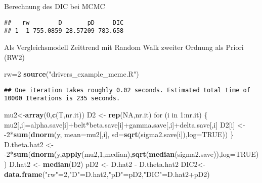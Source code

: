 \documentclass[ignorenonframetext,]{beamer}
\newenvironment{Shaded}{\begin{snugshade}}{\end{snugshade}}
\newcommand{\KeywordTok}[1]{\textcolor[rgb]{0.13,0.29,0.53}{\textbf{{#1}}}}
\newcommand{\DataTypeTok}[1]{\textcolor[rgb]{0.13,0.29,0.53}{{#1}}}
\newcommand{\DecValTok}[1]{\textcolor[rgb]{0.00,0.00,0.81}{{#1}}}
\newcommand{\StringTok}[1]{\textcolor[rgb]{0.31,0.60,0.02}{{#1}}}
\newcommand{\OtherTok}[1]{\textcolor[rgb]{0.56,0.35,0.01}{{#1}}}
\newcommand{\NormalTok}[1]{{#1}}
\begin{document}
\begin{frame}{Berechnung des DIC bei MCMC}
\begin{verbatim}
##   rw        D       pD     DIC
## 1  1 755.0859 28.57209 783.658
\end{verbatim}

Als Vergleichsmodell Zeittrend mit Random Walk zweiter Ordnung als
Priori (RW2)

\begin{Shaded}
\begin{Highlighting}[]
\NormalTok{rw=}\DecValTok{2}
\KeywordTok{source}\NormalTok{(}\StringTok{"drivers_example_mcmc.R"}\NormalTok{)}
\end{Highlighting}
\end{Shaded}

\begin{verbatim}
## One iteration takes roughly 0.02 seconds. Estimated total time of 10000 Iterations is 235 seconds.
\end{verbatim}

\begin{Shaded}
\begin{Highlighting}[]
\NormalTok{mu2<-}\KeywordTok{array}\NormalTok{(}\DecValTok{0}\NormalTok{,}\KeywordTok{c}\NormalTok{(T,nr.it))}
\NormalTok{D2 <-}\StringTok{ }\KeywordTok{rep}\NormalTok{(}\OtherTok{NA}\NormalTok{,nr.it)}
\NormalTok{for (i in }\DecValTok{1}\NormalTok{:nr.it)}
     \NormalTok{\{}
        \NormalTok{mu2[,i]=alpha.save[i]+belt*beta.save[i]+gamma.save[,i]+delta.save[,i]}
        \NormalTok{D2[i] <-}\StringTok{ }\NormalTok{-}\DecValTok{2}\NormalTok{*}\KeywordTok{sum}\NormalTok{(}\KeywordTok{dnorm}\NormalTok{(y, }\DataTypeTok{mean=}\NormalTok{mu2[,i], }\DataTypeTok{sd=}\KeywordTok{sqrt}\NormalTok{(sigma2.save[i]),}\DataTypeTok{log=}\OtherTok{TRUE}\NormalTok{))}
\NormalTok{\}}
\NormalTok{D.theta.hat2 <-}\StringTok{ }\NormalTok{-}\DecValTok{2}\NormalTok{*}\KeywordTok{sum}\NormalTok{(}\KeywordTok{dnorm}\NormalTok{(y,}\KeywordTok{apply}\NormalTok{(mu2,}\DecValTok{1}\NormalTok{,median),}\KeywordTok{sqrt}\NormalTok{(}\KeywordTok{median}\NormalTok{(sigma2.save)),}\DataTypeTok{log=}\OtherTok{TRUE}\NormalTok{))}
\NormalTok{D.hat2 <-}\StringTok{ }\KeywordTok{median}\NormalTok{(D2)}
\NormalTok{pD2 <-}\StringTok{ }\NormalTok{D.hat2 -}\StringTok{ }\NormalTok{D.theta.hat2}
\NormalTok{DIC2<-}\KeywordTok{data.frame}\NormalTok{(}\StringTok{"rw"}\NormalTok{=}\DecValTok{2}\NormalTok{,}\StringTok{"D"}\NormalTok{=D.hat2,}\StringTok{"pD"}\NormalTok{=pD2,}\StringTok{"DIC"}\NormalTok{=D.hat2+pD2)}
\end{Highlighting}
\end{Shaded}


\end{frame}
\end{document}
